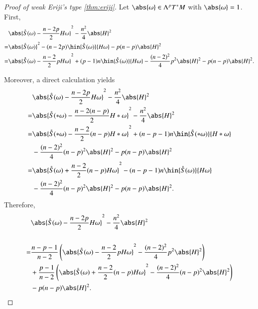 \documentclass[12pt]{amsart}
\theoremstyle{plain}
\theoremstyle{remark}
\theoremstyle{definition}
\numberwithin{equation}{section}
\begin{document}
\begin{proof}[Proof of weak Eriji's type \autoref{thm:eriji}]
Let $\abs{\omega}\in\Lambda^pT^*M$ with $\abs{\omega}=1$.
First,
\begin{align*}
&\abs{\mathring{S}(\omega)-\dfrac{n-2p}{2}H\omega}^2-\dfrac{n^2}{4}\abs{H}^2\\
=&\abs{\mathring{S}(\omega)}^2-(n-2p)\hin{\mathring{S}(\omega)}{H\omega}-p(n-p)\abs{H}^2\\
=&\abs{\mathring{S}(\omega)-\dfrac{n-2}{2}pH\omega}^2+(p-1)n\hin{\mathring{S}(\omega)}{H\omega}-\dfrac{(n-2)^2}{4}p^2\abs{H}^2-p(n-p)\abs{H}^2.
\end{align*}

Moreover, a direct calculation yields
\begin{align*}
&\abs{\mathring{S}(\omega)-\dfrac{n-2p}{2}H\omega}^2-\dfrac{n^2}{4}\abs{H}^2\\
=&\abs{\mathring{S}(*\omega)-\dfrac{n-2(n-p)}{2}H*\omega}^2-\dfrac{n^2}{4}\abs{H}^2\\
=&\abs{\mathring{S}(*\omega)-\dfrac{n-2}{2}(n-p)H*\omega}^2+(n-p-1)n\hin{\mathring{S}(*\omega)}{H*\omega}\\
&-\dfrac{(n-2)^2}{4}(n-p)^2\abs{H}^2-p(n-p)\abs{H}^2\\
=&\abs{\mathring{S}(\omega)+\dfrac{n-2}{2}(n-p)H\omega}^2-(n-p-1)n\hin{\mathring{S}(\omega)}{H\omega}\\
&-\dfrac{(n-2)^2}{4}(n-p)^2\abs{H}^2-p(n-p)\abs{H}^2.
\end{align*}
Therefore,
\begin{align*}
&\abs{\mathring{S}(\omega)-\dfrac{n-2p}{2}H\omega}^2-\dfrac{n^2}{4}\abs{H}^2\\\\
=&\dfrac{n-p-1}{n-2}\left(\abs{\mathring{S}(\omega)-\dfrac{n-2}{2}pH\omega}^2-\dfrac{(n-2)^2}{4}p^2\abs{H}^2\right)\\
&+\dfrac{p-1}{n-2}\left(\abs{\mathring{S}(\omega)+\dfrac{n-2}{2}(n-p)H\omega}^2-\dfrac{(n-2)^2}{4}(n-p)^2\abs{H}^2\right)\\
&-p(n-p)\abs{H}^2.
\end{align*}


\end{proof}
\end{document}
